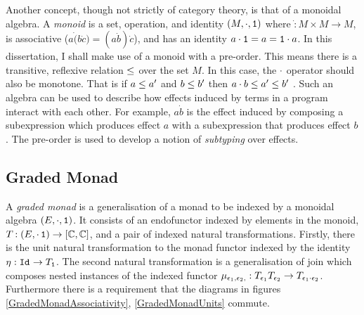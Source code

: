 \documentclass{Report}
\begin{document}
Another concept, though not strictly of category theory, is that of a monoidal algebra. A \textit{monoid} is a set, operation, and identity $(M, \dot, \1)$ where $\dot: M\times M \rightarrow M$, is associative ($a\dot(b\dot c) = (a\dot b)\dot c$), and has an identity $a\dot\1 = a = \1\dot a$. In this dissertation, I shall make use of a monoid with a pre-order. This means there is a transitive, reflexive relation $\subeffect$ over the set $M$. In this case, the $\dot$ operator should also be monotone. That is if $a \subeffect a'$ and $b\subeffect b'$ then $a\dot b \subeffect a'\subeffect b'$ . Such an algebra can be used to describe how effects induced by terms in a program interact with each other. For example, $a \dot b$ is the effect induced by composing a subexpression which produces effect $a$ with a subexpression that produces effect $b$. The pre-order is used to develop a notion of \textit{subtyping} over effects.

\subsection{Graded Monad}


A \textit{graded monad} is a generalisation of a monad to be indexed by a monoidal algebra $(E,\dot, \1)$. It consists of an endofunctor indexed by elements in the monoid, $\T{}{}: (E, \dot\, \1)  \rightarrow [\C, \C]$, and a pair of indexed natural transformations. Firstly, there is the unit natural transformation to the monad functor indexed by the identity $\point{}: \Id{} \rightarrow \T{\1}{}$. The second natural transformation is a generalisation of join which composes nested instances of the indexed functor $\bind{\e_1}{\e_2}{}: \T{\e_1}{\T{\e_2}{}} \rightarrow \T{\e_1 \dot \e_2}{}$. Furthermore there is a requirement that the diagrams in figures \ref{GradedMonadAssociativity}, \ref{GradedMonadUnits} commute.
\end{document}
